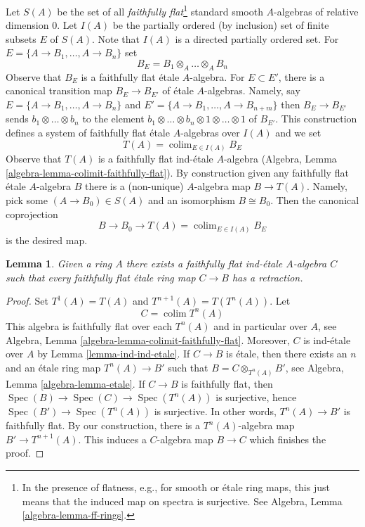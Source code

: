\documentclass{stacks-project}
\theoremstyle{plain}
\newtheorem{lemma}[subsection]{Lemma}
\theoremstyle{definition}
\theoremstyle{remark}
\numberwithin{equation}{subsection}
\def\colim{\mathop{\mathrm{colim}}\nolimits}
\def\Spec{\mathop{\mathrm{Spec}}}
\begin{document}
\medskip\noindent
Let $S(A)$ be the set of all {\it faithfully flat}\footnote{In the presence
of flatness, e.g., for smooth or \'etale ring maps,
this just means that the induced map on spectra is surjective. See
Algebra, Lemma \ref{algebra-lemma-ff-rings}.}
standard smooth $A$-algebras of relative dimension $0$.
Let $I(A)$ be the partially ordered (by inclusion) set of finite
subsets $E$ of $S(A)$. Note that $I(A)$ is a directed partially
ordered set. For $E = \{A \to B_1, \ldots, A \to B_n\}$ set
$$
B_E = B_1 \otimes_A \ldots \otimes_A B_n
$$
Observe that $B_E$ is a faithfully flat \'etale $A$-algebra.
For $E \subset E'$, there is a canonical transition map $B_E \to B_{E'}$
of \'etale $A$-algebras. Namely, say $E = \{A \to B_1, \ldots, A \to B_n\}$
and $E' = \{A \to B_1, \ldots, A \to B_{n + m}\}$ then
$B_E \to B_{E'}$ sends $b_1 \otimes \ldots \otimes b_n$ to the
element $b_1 \otimes \ldots \otimes b_n \otimes 1 \otimes \ldots \otimes 1$
of $B_{E'}$. This construction defines a system of faithfully flat
\'etale $A$-algebras over $I(A)$ and we set
$$
T(A) = \colim_{E \in I(A)} B_E
$$
Observe that $T(A)$ is a faithfully flat ind-\'etale $A$-algebra
(Algebra, Lemma \ref{algebra-lemma-colimit-faithfully-flat}). By construction
given any faithfully flat \'etale $A$-algebra $B$ there is a (non-unique)
$A$-algebra map $B \to T(A)$. Namely, pick some $(A \to B_0) \in S(A)$
and an isomorphism $B \cong B_0$. Then the canonical coprojection
$$
B \to B_0 \to 
T(A) = \colim_{E \in I(A)} B_E
$$
is the desired map.

\begin{lemma}
\label{lemma-first-construction}
Given a ring $A$ there exists a faithfully flat ind-\'etale $A$-algebra $C$
such that every faithfully flat \'etale ring map $C \to B$ has a retraction.
\end{lemma}

\begin{proof}
Set $T^1(A) = T(A)$ and $T^{n + 1}(A) = T(T^n(A))$. Let
$$
C = \colim T^n(A)
$$
This algebra is faithfully flat over each $T^n(A)$ and in particular
over $A$, see
Algebra, Lemma \ref{algebra-lemma-colimit-faithfully-flat}.
Moreover, $C$ is ind-\'etale over $A$ by Lemma \ref{lemma-ind-ind-etale}.
If $C \to B$ is \'etale, then there exists an $n$ and an \'etale
ring map $T^n(A) \to B'$ such that $B = C \otimes_{T^n(A)} B'$, see
Algebra, Lemma \ref{algebra-lemma-etale}.
If $C \to B$ is faithfully flat, then $\Spec(B) \to \Spec(C) \to \Spec(T^n(A))$
is surjective, hence $\Spec(B') \to \Spec(T^n(A))$ is surjective.
In other words, $T^n(A) \to B'$ is faithfully flat.
By our construction, there is a $T^n(A)$-algebra map
$B' \to T^{n + 1}(A)$. This induces a $C$-algebra map $B \to C$
which finishes the proof.
\end{proof}
\end{document}
